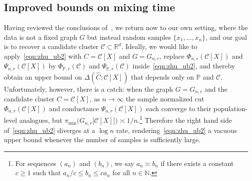 \documentclass[11pt,twoside]{article}
\theoremstyle{definition}
\newcommand{\Reals}{\mathbb{R}}
\newcommand{\1}{\mathbf{1}}
\newcommand{\Rd}{\Reals^d}
\newcommand{\mc}[1]{\mathcal{#1}}
\newcommand{\Pbb}{\mathbb{P}}
\newcommand{\wh}[1]{\widehat{#1}}
\begin{document}
\subsection{Improved bounds on mixing time} 
\label{subsec:mixing_time}
Having reviewed the conclusions of~\cite{zhu2013}, we return now to our own setting, where the data is not a fixed graph $G$ but instead random samples $\{x_1,\ldots,x_n\}$, and our goal is to recover a candidate cluster $\mc{C} \subset \Rd$. Ideally, we would like to apply~\eqref{eqn:zhu_ub2} with $C = \mc{C}[X]$ and $G = G_{n,r}$, replace $\Phi_{n,r}(\mc{C}[X])$ and $\Psi_{n,r}(\mc{C}[X])$ by $\Phi_{\Pbb,r}(\mc{C})$ and $\Psi_{\Pbb,r}(\mc{C})$ inside~\eqref{eqn:zhu_ub2}, and thereby obtain an upper bound on $\Delta(\wh{C};\mc{C}[X])$ that depends only on $\Pbb$ and $\mc{C}$. Unfortunately, however, there is a catch: when the graph $G = G_{n,r}$ and the candidate cluster $C = \mc{C}[X]$, as $n \to \infty$ the sample normalized cut $\Phi_{n,r}(\mc{C}[X])$ and conductance $\Psi_{n,r}(\mc{C}[X])$ each converge to their population-level analogues, but $\pi_{\min}\bigl(G_{n,r}\bigl[\mc{C}[X]\bigr]\bigr) \asymp 1/n$.\footnote{For sequences $(a_n)$ and $(b_n)$, we say $a_n \asymp b_n$ if there exists a constant $c \geq 1$ such that $a_n/c \leq b_n \leq c a_n$ for all $n \in \mathbb{N}$.} Therefore the right hand side of~\eqref{eqn:zhu_ub2} diverges at a $\log n$ rate, rendering~\eqref{eqn:zhu_ub2} a vacuous upper bound whenever the number of samples is sufficiently large.
\end{document}
